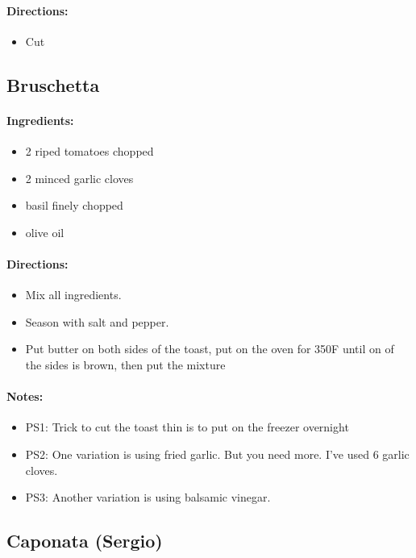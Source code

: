 \documentclass{article}
\begin{document}
\paragraph{Directions:}
\begin{itemize}
    \item Cut
\end{itemize}

\subsection{Bruschetta}

\paragraph{Ingredients:}
\begin{itemize}
    \item 2 riped tomatoes chopped
    \item 2 minced garlic cloves
    \item basil finely chopped
    \item olive oil
\end{itemize}

\paragraph{Directions:}
\begin{itemize}
    \item Mix all ingredients.
    \item Season with salt and pepper.
    \item Put butter on both sides of the toast, put on the oven for 350F until on of the sides is brown, then put the mixture
\end{itemize}

\paragraph{Notes:}
\begin{itemize}
    \item PS1: Trick to cut the toast thin is to put on the freezer overnight
    \item PS2: One variation is using fried garlic. But you need more. I've used 6 garlic cloves.
    \item PS3: Another variation is using balsamic vinegar.
\end{itemize}

\subsection{Caponata (Sergio)}
\end{document}
